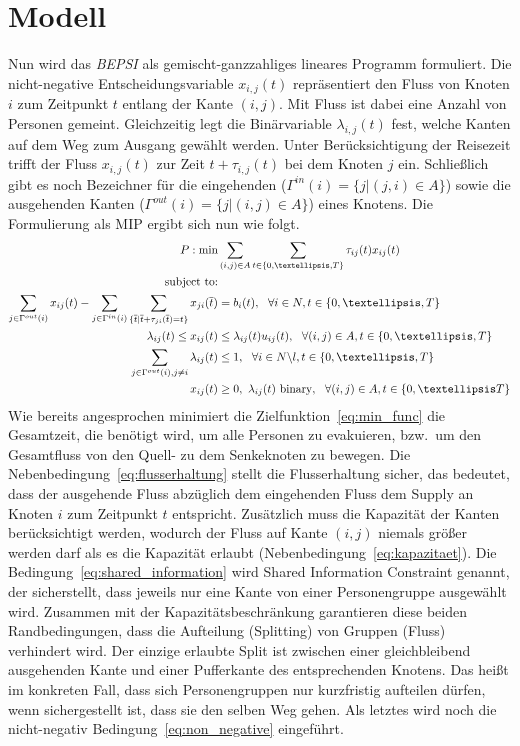 \documentclass[a4paper, 11pt]{scrreprt}
\begin{document}
\section{Modell}
\label{sec:modell}
Nun wird das \textit{BEPSI} als gemischt-ganzzahliges lineares Programm formuliert.
Die nicht-negative Entscheidungsvariable $x_{i,j}(t)$ repräsentiert den Fluss
von Knoten $i$ zum Zeitpunkt $t$ entlang der Kante $(i,j)$.
Mit Fluss ist dabei eine Anzahl von Personen gemeint. Gleichzeitig legt die
Binärvariable $\lambda_{i,j}(t)$ fest, welche Kanten auf dem Weg zum Ausgang
gewählt werden. Unter Berücksichtigung der Reisezeit trifft der Fluss
$x_{i,j}(t)$ zur Zeit $t + \tau_{i,j}(t)$ bei dem Knoten $j$ ein. Schließlich
gibt es noch Bezeichner für die eingehenden
($\Gamma^{in}(i) = \{j|(j,i) \in A\}$)
sowie die ausgehenden Kanten
($\Gamma^{out}(i) = \{j|(i,j) \in A\}$)
eines Knotens.
Die Formulierung als MIP ergibt sich nun wie folgt.
\begin{align}
  P:\text{min}  &\sum_{(i,j)\in A}\sum_{t\in\{0,…,T\}}\tau_{ij}(t)x_{ij}(t) \label{eq:min_func} \\
  \text{subject to:}\notag\\
  \sum_{j \in \Gamma^{out} (i)}x_{ij}(t) - \sum_{j \in \Gamma^{in} (i)}\sum_{\{\overline{t}|\overline{t}+\tau_{ji}(\overline{t}) = t\}}x_{ji}(\overline{t}) &= b_i(t), \,\,\,\, \forall i \in N, t \in \{0,…,T\} \label{eq:flusserhaltung}\\
  \lambda_{ij}(t) \leq x_{ij}(t) &\leq \lambda_{ij}(t)u_{ij}(t), \,\,\,\, \forall (i,j) \in A, t \in \{0,…,T\} \label{eq:kapazitaet} \\
  \sum_{j \in \Gamma^{out} (i), j \neq i} \lambda_{ij}(t) &\leq 1, \,\,\,\, \forall i \in N\backslash l, t \in \{0,…,T\} \label{eq:shared_information} \\
  x_{ij}(t) &\geq 0,\,\, \lambda_{ij}(t)\,\, \text{binary}, \,\,\,\, \forall (i,j) \in A, t \in \{0,…T\} \label{eq:non_negative}
\end{align}
Wie bereits angesprochen minimiert die Zielfunktion~\ref{eq:min_func} die Gesamtzeit, die benötigt wird,
um alle Personen zu evakuieren, bzw.\ um den Gesamtfluss von den Quell- zu dem Senkeknoten zu bewegen.
Die Nebenbedingung~\ref{eq:flusserhaltung} stellt die Flusserhaltung sicher, das bedeutet, dass der
ausgehende Fluss abzüglich dem eingehenden Fluss dem Supply an Knoten $i$ zum Zeitpunkt $t$ entspricht.
Zusätzlich muss die Kapazität der Kanten berücksichtigt werden, wodurch der Fluss auf Kante $(i,j)$
niemals größer werden darf als es die Kapazität erlaubt (Nebenbedingung~\ref{eq:kapazitaet}).
Die Bedingung~\ref{eq:shared_information} wird Shared Information Constraint genannt, der sicherstellt,
dass jeweils nur eine Kante von einer Personengruppe ausgewählt wird. Zusammen mit der Kapazitätsbeschränkung
garantieren diese beiden Randbedingungen, dass die Aufteilung (Splitting) von Gruppen (Fluss) verhindert wird.
Der einzige erlaubte Split ist zwischen einer gleichbleibend ausgehenden Kante und einer Pufferkante des
entsprechenden Knotens.
Das heißt im konkreten Fall, dass sich Personengruppen nur kurzfristig aufteilen dürfen, wenn
sichergestellt ist, dass sie den selben Weg gehen.
Als letztes wird noch die nicht-negativ Bedingung~\ref{eq:non_negative} eingeführt.
\end{document}
